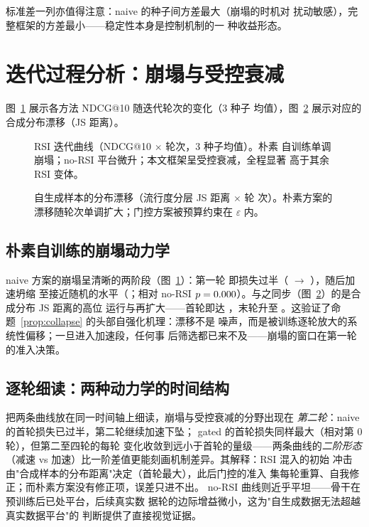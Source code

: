 标准差一列亦值得注意：naive 的种子间方差最大（崩塌的时机对
扰动敏感），完整框架的方差最小——稳定性本身是控制机制的一
种收益形态。

\section{迭代过程分析：崩塌与受控衰减}
图~\ref{fig:rounds} 展示各方法 NDCG@10 随迭代轮次的变化（3 种子
均值），图~\ref{fig:drift} 展示对应的合成分布漂移（JS 距离）。

\begin{figure}[t]
\centering

\caption{RSI 迭代曲线（NDCG@10 $\times$ 轮次，3 种子均值）。朴素
自训练单调崩塌；no-RSI 平台微升；本文框架呈受控衰减，全程显著
高于其余 RSI 变体。}
\label{fig:rounds}
\end{figure}

\begin{figure}[t]
\centering

\caption{自生成样本的分布漂移（流行度分层 JS 距离 $\times$ 轮
次）。朴素方案的漂移随轮次单调扩大；门控方案被预算约束在
$\varepsilon$ 内。}
\label{fig:drift}
\end{figure}

\subsection{朴素自训练的崩塌动力学}
naive 方案的崩塌呈清晰的两阶段（图~\ref{fig:rounds}）：第一轮
即损失过半（\BaseNdcg{} $\to$ \NaiveRoundsOne{}），随后加速坍缩
至接近随机的水平（\NaiveFinal{}；相对 no-RSI $p=0.000{}
$）。与之同步（图~\ref{fig:drift}）的是合成分布 JS 距离的高位
运行与再扩大——首轮即达 \NaiveJsFirst{}，末轮升至 \NaiveJsLast{}
。这验证了命题~\ref{prop:collapse} 的头部自强化机理：漂移不是
噪声，而是被训练逐轮放大的系统性偏移；一旦进入加速段，任何事
后筛选都已来不及——崩塌的窗口在第一轮的准入决策。

\subsection{逐轮细读：两种动力学的时间结构}
把两条曲线放在同一时间轴上细读，崩塌与受控衰减的分野出现在
\emph{第二轮}：naive 的首轮损失已过半，第二轮继续加速下坠；
gated 的首轮损失同样最大（相对第 0 轮），但第二至四轮的每轮
变化收敛到远小于首轮的量级——两条曲线的\emph{二阶形态}（减速
vs 加速）比一阶差值更能刻画机制差异。其解释：RSI 混入的初始
冲击由"合成样本的分布距离"决定（首轮最大），此后门控的准入
集每轮重算、自我修正；而朴素方案没有修正项，误差只进不出。
no-RSI 曲线则近乎平坦——骨干在预训练后已处平台，后续真实数
据轮的边际增益微小，这为"自生成数据无法超越真实数据平台"的
判断提供了直接视觉证据。

